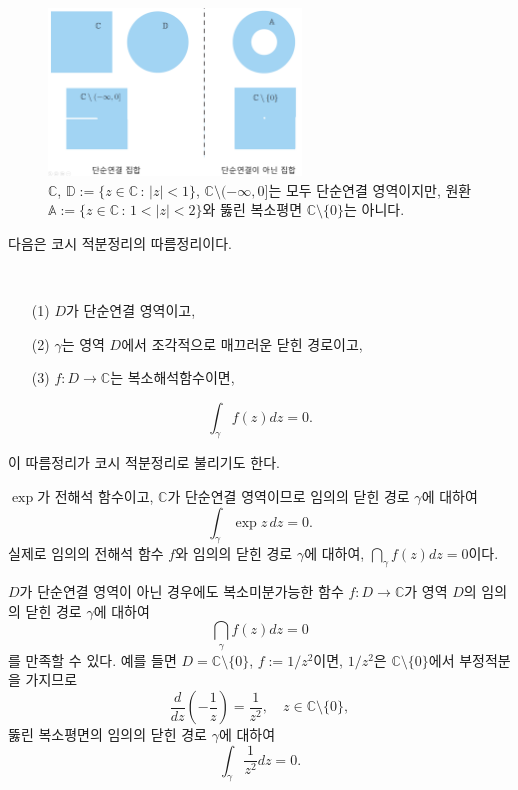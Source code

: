 
\begin{figure}[!h]
\begin{center}
\includegraphics[width=0.6\textwidth]{./SaltChapter/figs/fig-3-13-kr}
\end{center}
\caption{$\mathbb C$, $\mathbb D:=\{z\in\mathbb C\,:\, |z|<1\}$,
$\mathbb C\setminus(-\infty,0]$는 모두 단순연결 영역이지만,
원환 $\mathbb A:= \{ z\in\mathbb C \,:\,  1<|z|<2 \}$와 
뚫린 복소평면 $\mathbb C\setminus \{0\}$는 아니다.}
\label{fig-3-13}
\end{figure}

다음은 코시 적분정리의 따름정리이다.

\begin{salt_corollary} \label{coro-3-2}
\
\begin{itemize}
\item[(1)] $D$가 단순연결 영역이고,
\item[(2)] $\gamma$는 영역 $D$에서 조각적으로 매끄러운 닫힌 경로이고,
\item[(3)] $f:D\to\mathbb C$는  복소해석함수이면,
\end{itemize}
\[
\int_\gamma f(z)dz = 0.
\]
\end{salt_corollary}

이 따름정리가 코시 적분정리로 불리기도 한다.

\begin{saltexample} [label=example-3-9]{}{}
$\exp$가 전해석 함수이고, $\mathbb C$가 단순연결 영역이므로
임의의 닫힌 경로 $\gamma$에 대하여
\[
\int_\gamma \exp z \, dz = 0.
\]
실제로 임의의 전해석 함수 $f$와 임의의 닫힌 경로 $\gamma$에 대하여, $\dint_\gamma f(z)dz=0$이다.
\end{saltexample}

$D$가 단순연결 영역이 아닌 경우에도 복소미분가능한 함수 $f:D\to \mathbb C$가
영역 $D$의 임의의 닫힌 경로 $\gamma$에 대하여
\[
\dint_\gamma f(z)dz=0
\]
를 만족할 수 있다.
예를 들면 $D=\mathbb C\setminus \{0\}$, $f:=1/z^2$이면,
$1/z^2$은 $\mathbb C\setminus \{0\}$에서 부정적분을 가지므로
\[
\dfrac d{dz}\left(- \dfrac 1z\right) = \dfrac1{z^2}, \quad z\in \mathbb C\setminus \{0\},
\]
뚫린 복소평면의 임의의 닫힌 경로 $\gamma$에 대하여
\[
\int_\gamma \dfrac 1{z^2}dz=0.
\]

